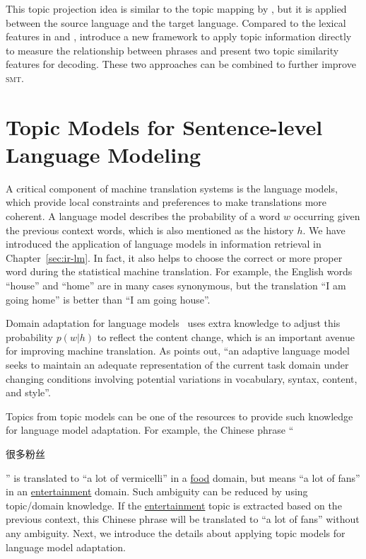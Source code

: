 This topic projection idea is similar to the topic mapping by
\citet{su-12}, but it is applied between the source language and the
target language. Compared to the lexical features in
\citet{Eidelman-12} and \citet{hu-14}, \citet{xiao-12} introduce a new
framework to apply topic information directly to measure the relationship between phrases and present two topic similarity features for decoding. These two approaches can
be combined to further improve \textsc{smt}.

\section{Topic Models for Sentence-level Language Modeling}


A critical component of machine translation systems is the language
models, which provide local constraints and preferences to make
translations more coherent. A language model describes the probability
of a word $w$ occurring given the previous context words, which is
also mentioned as the history $h$. We have introduced the application
of language models in information retrieval in
Chapter~\ref{sec:ir-lm}. In fact, it also helps to choose the correct
or more proper word during the statistical machine translation. For
example, the English words ``house'' and ``home'' are in many cases synonymous, but the translation ``I am going home'' is better than
``I am going house''.

Domain adaptation for language models~\citep{Bellegarda-04,wood-09}
uses extra knowledge to adjust this probability $p(w|h)$ to reflect
the content change, which is an important avenue for improving machine
translation. As \citet{Bellegarda-04} points out, ``an adaptive
language model seeks to maintain an adequate representation of the
current task domain under changing conditions involving potential
variations in vocabulary, syntax, content, and style''.

Topics from topic models can be one of the resources to provide such
knowledge for language model adaptation. For example, the Chinese
phrase ``\begin{CJK*}{UTF8}{gbsn}很多粉丝\end{CJK*}'' is translated to
  ``a lot of vermicelli'' in a \underline{food} domain, but means ``a
  lot of fans'' in an \underline{entertainment} domain. Such ambiguity
  can be reduced by using topic/domain knowledge. If the \underline{entertainment} topic is extracted based on
  the previous context, this Chinese phrase will be translated to ``a
  lot of fans'' without any ambiguity. Next, we introduce the details
  about applying topic models for language model adaptation.


